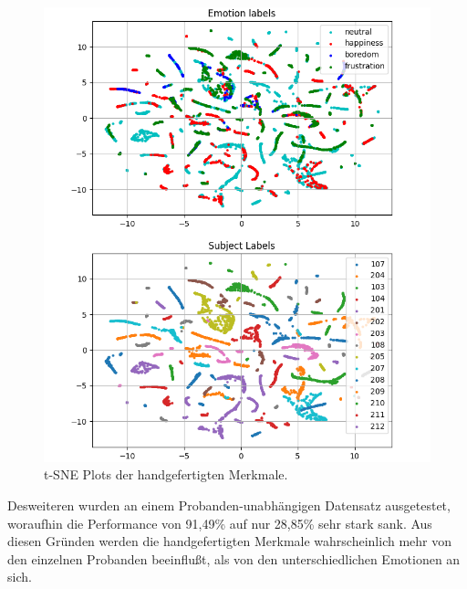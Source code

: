 \begin{figure}[H]
\includegraphics[width=\textwidth]{Images/HCF-tSNE.png} 
\vspace{-0.3cm} \caption{ t-SNE Plots der handgefertigten Merkmale. }
\label{fig:overfitting} \end{figure} \vspace{0.5cm}


Desweiteren wurden an einem Probanden-unabhängigen Datensatz ausgetestet, woraufhin die Performance von 91,49\% auf nur 28,85\% sehr stark sank.
Aus diesen Gründen werden die handgefertigten Merkmale wahrscheinlich mehr von den einzelnen Probanden beeinflußt, als von den unterschiedlichen Emotionen an sich. \\ 





